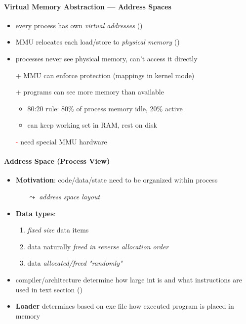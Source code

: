 \paragraph{Virtual Memory Abstraction --- Address Spaces}
\begin{itemize}
	\item every process has own \emph{virtual addresses} ()
	\item MMU relocates each load/store to \emph{physical memory} ()
	\item processes never see physical memory, can't access it directly
	\item[\textcolor{black!60!green}{+}]  MMU can enforce protection (mappings in kernel mode)
	\item[\textcolor{black!60!green}{+}] programs can see more memory than available
	\begin{itemize}
		\item 80:20 rule: 80\% of process memory idle, 20\% active
		\item can keep working set in RAM, rest on disk
	\end{itemize}
	\item[\textcolor{red}{-}] need special MMU hardware
\end{itemize}

\paragraph{Address Space (Process View)}
\begin{itemize}
	\item \textbf{Motivation}: code/data/state need to be organized within process
	\begin{itemize}
		\item[$ \leadsto $] \emph{address space layout}
	\end{itemize}
	\item \textbf{Data types}:
	\begin{enumerate}
		\item \emph{fixed size} data items
		\item data naturally \emph{freed in reverse allocation order}
		\item data \emph{allocated/freed "randomly"}
	\end{enumerate}
	\item compiler/architecture determine how large int is and what instructions are used in text section ()
	\item \textbf{Loader} determines based on exe file how executed program is placed in memory
\end{itemize}

